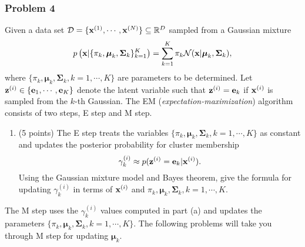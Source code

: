 \documentclass[12pt,a4paper]{article}
\renewcommand{\v}[1]{\ifmmode\mathbf{#1}\fi}
\renewcommand{\l}{\left}
\renewcommand{\r}{\right}
\newcommand{\SUM}[2]{\sum\limits_{#1}^{#2}}
\def\R{\ifmmode\mathbb R\fi}
\begin{document}
\newpage
\subsubsection*{Problem 4}
Given a data set $\mathcal D = \{\v x^{(1)}, \cdots, \v x^{(N)} \} \subseteq \R^D$ sampled from a Gaussian mixture
\begin{equation*}
p\l( \v x \vert \{ \pi_k , \boldsymbol\mu_k, \boldsymbol\Sigma_k\}_{k=1}^K \r) = \SUM{k=1}K \pi_k \mathcal N(\v x \vert \boldsymbol\mu_k, \boldsymbol\Sigma_k),
\end{equation*}
where $\{ \pi_k , \boldsymbol\mu_k, \boldsymbol\Sigma_k, k = 1, \cdots, K\}$ are parameters to be determined. Let $\v z^{(i)} \in \{\v e_1, \cdots, \v e_K \}$ denote the latent variable such that $\v z^{(i)} = \v e_k$ if $\v x^{(i)}$ is sampled from the $k$-th Gaussian. The EM (\textit{expectation-maximization}) algorithm consists of two steps, E step and M step. 
\begin{enumerate}[label=(\alph*)]
	\item (5 points)
	The E step treats the variables $\{ \pi_k , \boldsymbol\mu_k, \boldsymbol\Sigma_k, k = 1, \cdots, K\}$ as constant and updates the posterior probability for cluster membership
	\begin{equation*}
	\gamma^{(i)}_k \approx p(\v z^{(i)} = \v e_k \vert \v x^{(i)}).
	\end{equation*}
	Using the Gaussian mixture model and Bayes theorem, give the formula for updating $\gamma_k^{(i)}$ in terms of $\v x^{(i)}$ and $\pi_k , \boldsymbol\mu_k, \boldsymbol\Sigma_k, k = 1, \cdots, K$.
\end{enumerate}
The M step uses the $\gamma^{(i)}_k$ values computed in part (a) and updates the parameters $\{ \pi_k , \boldsymbol\mu_k, \boldsymbol\Sigma_k, k = 1, \cdots, K\}$. The following problems will take you through M step for updating $\boldsymbol\mu_k$. 
\end{document}
